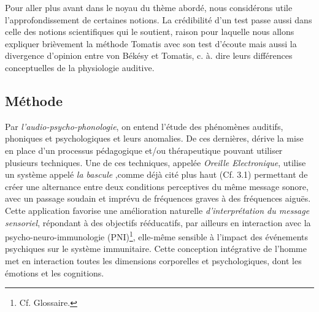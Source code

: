 

Pour aller plus avant dans le noyau du thème abordé, nous considérons utile
l'approfondissement de certaines notions. La crédibilité d'un test passe aussi dans celle des 
notions scientifiques qui le soutient, raison pour laquelle nous allons expliquer brièvement  la 
méthode Tomatis avec son test d'écoute mais aussi la
divergence d'opinion entre von Békésy et Tomatis, c. à. dire leurs différences conceptuelles de la 
physiologie auditive. 
\subsection{Méthode}

Par {\textit{l'audio-psycho-phonologie}}, on entend l'étude des
phénomènes auditifs, phoniques et psychologiques et leurs anomalies.
De ces dernières,  dérive la mise en place d'un processus pédagogique
et/ou thérapeutique pouvant
utiliser plusieurs techniques.
Une de ces techniques,
  appelée
\label{outil_oreille_electro}
\textit{Oreille Electronique}, utilise
un système appelé \textit{ la
bascule} \autocite{escera-key},comme déjà cité plus haut (Cf. 3.1) permettant de créer une alternance 
entre deux conditions perceptives
du même message sonore, avec un passage soudain et imprévu de fréquences graves à des
fréquences aiguës.
Cette application favorise une amélioration naturelle \emph{d'interprétation du message
sensoriel}, répondant à des objectifs rééducatifs, par ailleurs en
interaction avec la psycho-neuro-immunologie (\gls{PNI})\footnote{Cf. Glossaire.}, elle-même sensible à
l'impact des événements psychiques sur le système immunitaire.
Cette conception intégrative de l'homme met en interaction toutes les
dimensions corporelles et psychologiques, dont les émotions et les cognitions.

